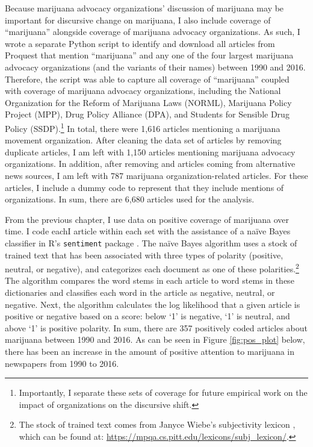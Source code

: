 Because marijuana advocacy organizations' discussion of marijuana may be important for discursive change on marijuana, I also include coverage of ``marijuana'' alongside coverage of marijuana advocacy organizations. As such, I wrote a separate Python script to identify and download all articles from Proquest that mention ``marijuana'' and any one of the four largest marijuana advocacy organizations (and the variants of their names) between 1990 and 2016. Therefore, the script was able to capture all coverage of ``marijuana'' coupled with coverage of marijuana advocacy organizations, including the National Organization for the Reform of Marijuana Laws (NORML), Marijuana Policy Project (MPP), Drug Policy Alliance (DPA), and Students for Sensible Drug Policy (SSDP).\footnote{Importantly, I separate these sets of coverage for future empirical work on the impact of organizations on the discursive shift.} In total, there were 1,616 articles mentioning a marijuana movement organization. After cleaning the data set of articles by removing duplicate articles, I am left with 1,150 articles mentioning marijuana advocacy organizations. In addition, after removing and articles coming from alternative news sources, I am left with 787 marijuana organization-related articles. For these articles, I include a dummy code to represent that they include mentions of organizations. In sum, there are 6,680 articles used for the analysis. 


From the previous chapter, I use data on positive coverage of marijuana over time. I code eachI article within each set with the assistance of a na\"{i}ve Bayes classifier in \textsf{R}'s \texttt{sentiment} package \citep{jurka_2012}. The na\"{i}ve Bayes algorithm uses a stock of trained text that has been associated with three types of polarity (positive, neutral, or negative), and categorizes each document as one of these polarities.\footnote{The stock of trained text comes from Janyce Wiebe's subjectivity lexicon \citep{wilson_et_al_2005}, which can be found at: \url{https://mpqa.cs.pitt.edu/lexicons/subj_lexicon/}.} The algorithm compares the word stems in each article to word stems in these dictionaries and classifies each word in the article as negative, neutral, or negative. Next, the algorithm calculates the log likelihood that a given article is positive or negative based on a score: below `1' is negative, `1' is neutral, and above `1' is positive polarity.  In sum, there are 357 positively coded articles about marijuana between 1990 and 2016. As can be seen in Figure \ref{fig:pos_plot} below, there has been an increase in the amount of positive attention to marijuana in newspapers from 1990 to 2016.


